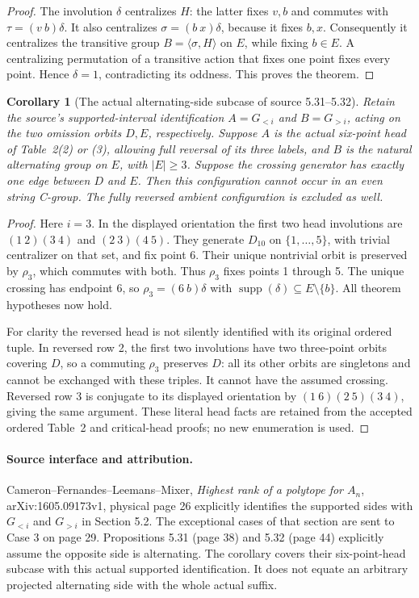 \documentclass[11pt,a4paper]{article}
\newtheorem{corollary}[theorem]{Corollary}
\newcommand{\gen}[1]{\langle#1\rangle}
\begin{document}
\begin{proof}
The involution $\delta$ centralizes $H$: the latter fixes $v,b$
and commutes with $\tau=(v\ b)\delta$. It also centralizes
$\sigma=(b\ x)\delta$, because it fixes $b,x$.
Consequently it centralizes the transitive group
$B=\gen{\sigma,H}$ on $E$, while fixing $b\in E$.
A centralizing permutation of a transitive action that fixes one
point fixes every point. Hence $\delta=1$, contradicting its
oddness. This proves the theorem.
\end{proof}

\begin{corollary}[The actual alternating-side subcase of source 5.31--5.32]
Retain the source's supported-interval identification
$A=G_{<i}$ and $B=G_{>i}$, acting on the two omission orbits
$D,E$, respectively. Suppose $A$ is the actual six-point head of
Table~2(2) or (3), allowing full reversal of its three labels,
and $B$ is the natural alternating group on $E$, with $|E|\ge3$.
Suppose the crossing generator has exactly one edge between $D$ and $E$.
Then this configuration cannot occur in an even string C-group.
The fully reversed ambient configuration is excluded as well.
\end{corollary}
\begin{proof}
Here $i=3$. In the displayed orientation the first two head
involutions are $(1\ 2)(3\ 4)$ and $(2\ 3)(4\ 5)$.
They generate $D_{10}$ on $\{1,\ldots,5\}$, with trivial
centralizer on that set, and fix point 6. Their unique nontrivial
orbit is preserved by $\rho_3$, which commutes with both.
Thus $\rho_3$ fixes points 1 through 5. The unique crossing has
endpoint 6, so $\rho_3=(6\ b)\delta$ with
$\operatorname{supp}(\delta)\subseteq E\setminus\{b\}$.
All theorem hypotheses now hold.

For clarity the reversed head is not silently identified with
its original ordered tuple. In reversed row 2, the first two
involutions have two three-point orbits covering $D$, so a commuting
$\rho_3$ preserves $D$: all its other orbits are singletons and
cannot be exchanged with these triples. It cannot have the assumed
crossing. Reversed row 3 is conjugate to its displayed orientation
by $(1\ 6)(2\ 5)(3\ 4)$, giving the same argument.
These literal head facts are retained from the accepted ordered
Table~2 and critical-head proofs; no new enumeration is used.
\end{proof}

\paragraph{Source interface and attribution.}
Cameron--Fernandes--Leemans--Mixer,
\emph{Highest rank of a polytope for $A_n$}, arXiv:1605.09173v1,
physical page 26 explicitly identifies the supported sides with
$G_{<i}$ and $G_{>i}$ in Section 5.2. The exceptional cases of
that section are sent to Case 3 on page 29. Propositions 5.31
(page 38) and 5.32 (page 44) explicitly assume the opposite side
is alternating. The corollary covers their six-point-head subcase
with this actual supported identification. It does not equate
an arbitrary projected alternating side with the whole actual suffix.
\end{document}
